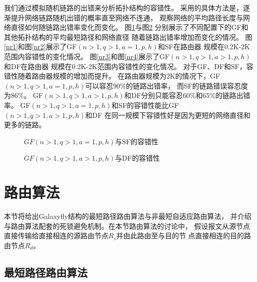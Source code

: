 我们通过模拟随机链路的出错来分析拓扑结构的容错性。
采用的具体方法是，逐渐提升网络链路随机出错的概率直至网络不连通，
观察网络的平均路径长度与网络直径如何随链路出错率变化而变化。
图\ref{fig:Figure8a}与图\ref{fig:Figure8b}
分别展示了不同配置下的GF和其他拓扑结构的平均最短路径和网络直径
随着链路出错率增加而变化的情况。
图\ref{nr1}和图\ref{nr2}展示了GF$(n>1,q>1,a=1,p,h)$和SF在路由器
规模在0.2K-2K范围内容错性的变化情况。
图\ref{nr3}和图\ref{nr4}展示了GF$(n>1,q>1,a>1,p,h)$和DF在路由器
规模在0.2K-2K范围内容错性的变化情况。
对于GF、DF和SF，容错性随着路由器规模的增加而提升。
在路由器规模为2K的情况下，GF$(n>1,q>1,a=1,p,h)$可以容忍$90\%$的链路出错率，
而SF的链路错误容忍度为$86\%$。
GF$(n>1,q>1,a>1,p,h)$和DF分别只能容忍$60\%$和$65\%$的链路出错率。
GF$(n>1,q>1,a=1,p,h)$和SF的容错性能比GF$(n>1,q>1,a>1,p,h)$和DF
在同一规模下容错性好是因为更短的网络直径和更多的链路。

\begin{figure}
  \centering
  \begin{minipage}[t]{\textwidth}
    \centering
    \caption{$GF(n\!\!>\!\!1,q\!\!>\!\!1,a\!\!=\!\!1,p,h)$与SF的容错性}
  \label{fig:Figure8a}
  \end{minipage}
\end{figure}
\begin{figure}
  \centering
  \begin{minipage}[t]{\textwidth}
    \centering
    \caption{$GF(n\!\!>\!\!1,q\!\!>\!\!1,a\!\!>\!\!1,p,h)$与DF的容错性}
    \label{fig:Figure8b}
  \end{minipage}
\end{figure}


\section{路由算法}

本节将给出Galaxyfly结构的最短路径路由算法与非最短自适应路由算法，
并介绍与路由算法配套的死锁避免机制。在本节路由算法的讨论中，
假设报文从源节点直接传输给直接相连的源路由节点$R_s$并由此路由至与目的节
点直接相连的目的路由节点$R_d$。

\subsection{最短路径路由算法}

